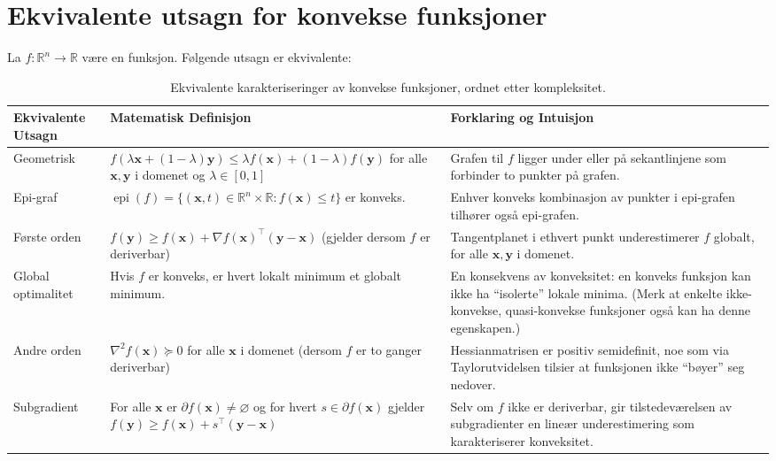 \section{Ekvivalente utsagn for konvekse funksjoner}

La \(f:\mathbb{R}^n \to \mathbb{R}\) være en funksjon. Følgende utsagn er ekvivalente:
\begin{table}[H]
	\centering
	\small
	\begin{tabularx}{\textwidth}{|X|X|X|}
		\rowcolor{rem-color!25}
		\textbf{Ekvivalente Utsagn} & \textbf{Matematisk Definisjon} & \textbf{Forklaring og Intuisjon} \\
		\hline
		Geometrisk & 
		\( f(\lambda \symbf{x} + (1-\lambda)\symbf{y}) \le \lambda f(\symbf{x}) + (1-\lambda)f(\symbf{y}) \)  
		for alle \( \symbf{x},\symbf{y} \) i domenet og \( \lambda \in [0,1] \)
		& Grafen til \( f \) ligger under eller på sekantlinjene som forbinder to punkter på grafen. \\
		\hline
		Epi-graf &
		\(\operatorname{epi}(f) = \{ (\symbf{x},t)\in\mathbb{R}^n\times\mathbb{R} : f(\symbf{x})\le t \}\) er konveks.
		& Enhver konveks kombinasjon av punkter i epi-grafen tilhører også epi-grafen. \\
		\hline
		Første orden &
		\( f(\symbf{y}) \ge f(\symbf{x}) + \nabla f(\symbf{x})^\top (\symbf{y}-\symbf{x}) \)
		(gjelder dersom \( f \) er deriverbar)
		& Tangentplanet i ethvert punkt underestimerer \( f \) globalt, for alle \( \symbf{x},\symbf{y} \) i domenet. \\
		\hline
		Global optimalitet &
		Hvis \( f \) er konveks, er hvert lokalt minimum et globalt minimum.
		& En konsekvens av konveksitet: en konveks funksjon kan ikke ha ``isolerte'' lokale minima. (Merk at enkelte ikke-konvekse, quasi-konvekse funksjoner også kan ha denne egenskapen.) \\\hline
		Andre orden &
		\( \nabla^2 f(\symbf{x}) \succeq 0 \) for alle \( \symbf{x} \) i domenet 
		(dersom \( f \) er to ganger deriverbar)
		& Hessianmatrisen er positiv semidefinit, noe som via Taylorutvidelsen tilsier at funksjonen ikke ``bøyer'' seg nedover. \\
		\hline
		Subgradient &
		For alle \( \symbf{x} \) er \( \partial f(\symbf{x}) \neq \varnothing \) og for hvert \( s \in \partial f(\symbf{x}) \) gjelder 
		\( f(\symbf{y}) \ge f(\symbf{x}) + s^\top (\symbf{y}-\symbf{x}) \)
		& Selv om \( f \) ikke er deriverbar, gir tilstedeværelsen av subgradienter en lineær underestimering som karakteriserer konveksitet. 
		\\
		\hline
	\end{tabularx}
	\caption{Ekvivalente karakteriseringer av konvekse funksjoner, ordnet etter kompleksitet.}
	\label{tab:convex_equivalence}
\end{table}

